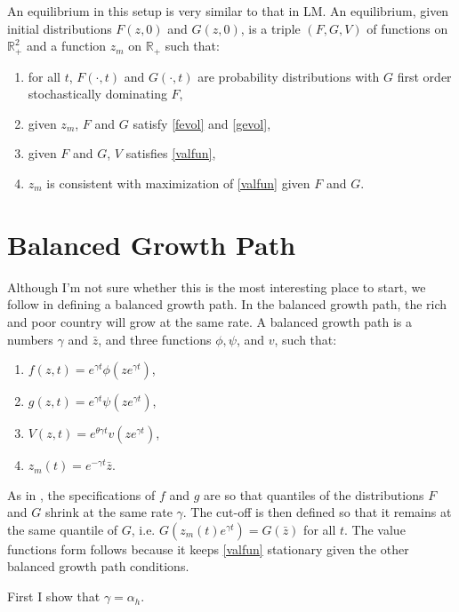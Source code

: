 \documentclass{article}
\begin{document}
An equilibrium in this setup is very similar to that in LM.  
An equilibrium, given initial distributions $F(z,0)$ and $G(z,0)$, is a triple $(F,G,V)$ of functions on $\mathbb{R}_+^2$ and a function $z_m$ on $\mathbb{R}_+$ such that:
\begin{enumerate}
  \item for all $t$, $F(\cdot,t)$ and $G(\cdot,t)$ are probability distributions with $G$ first order stochastically dominating $F$, 
  \item given $z_m$, $F$ and $G$ satisfy \eqref{fevol} and \eqref{gevol},
  \item given $F$ and $G$, $V$ satisfies \eqref{valfun},
  \item $z_m$ is consistent with maximization of \eqref{valfun} given $F$ and $G$. 
\end{enumerate}

\section{Balanced Growth Path}
Although I'm not sure whether this is the most interesting place to start, we follow \citet{LucasMoll2012} in defining a balanced growth path.
In the balanced growth path, the rich and poor country will grow at the same rate.
A balanced growth path is a numbers $\gamma$ and $\bar{z}$, and three functions $\phi,\psi$, and $v$, such that:
\begin{enumerate}
  \item $f(z,t) = e^{\gamma t} \phi(z e^{\gamma t})$,
  \item $g(z,t) = e^{\gamma t} \psi(z e^{\gamma t})$,
  \item $V(z,t) = e^{\theta \gamma t} v(ze^{\gamma t})$,
  \item $z_m(t) = e^{-\gamma t} \bar{z}$.
\end{enumerate}
As in \citet{LucasMoll2012}, the specifications of $f$ and $g$ are so that quantiles of the distributions $F$ and $G$ shrink at the same rate $\gamma$.
The cut-off is then defined so that it remains at the same quantile of $G$, i.e. $G(z_m(t) e^{\gamma t}) = G(\bar{z})$ for all $t$.
The value functions form follows because it keeps \eqref{valfun} stationary given the other balanced growth path conditions.

First I show that $\gamma = \alpha_h$.
\end{document}
